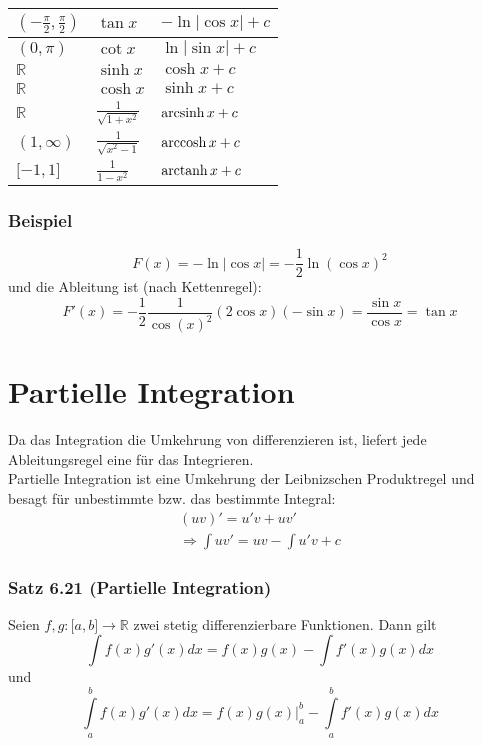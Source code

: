 \begin{tabularx}{\textwidth}{|Y|Y|Y|}
$(-\frac{\pi}{2},\frac{\pi}{2})$        & $\tan{x}$                             & $- \ln \left| {\cos x} \right| + c$                                                                \\ [1.5ex]\hline
$(0,\pi)$        & $\cot{x}$                             & $\ln \left| {\sin x} \right| + c$                                                                \\[1.5ex]\hline
$\mathbb{R}$ & $\sinh x$ & $\cosh x + c$\\[1.5ex]\hline
$\mathbb{R}$ & $\cosh x$ & $\sinh x + c$\\[1.5ex]\hline
$\mathbb{R}$ & $\frac{1}{\sqrt{1+x^2}}$  & $\operatorname{arcsinh} x + c$ \\[1.5ex]\hline
$(1,\infty)$ & $\frac{1}{\sqrt{x^2-1}}$ & $\operatorname{arccosh} x + c$ \\[1.5ex]\hline
$\lbrack -1,1\rbrack$ & $\frac{1}{1-x^2}$ & $\operatorname{arctanh} x + c$ \\[1.5ex]\hline
 \end{tabularx}

\subsubsection*{Beispiel}
$$F(x)=-\ln\left| \cos x \right| = -\frac{1}{2}\ln\left(\cos x\right)^2$$
und die Ableitung ist (nach Kettenregel):
\[F'(x) =  - \frac{1}{2}\frac{1}{{\cos {{(x)}^2}}}(2\cos x)( - \sin x) = \frac{{\sin x}}{{\cos x}} = \tan x\]

\section{Partielle Integration}
Da das Integration die Umkehrung von differenzieren ist, liefert jede Ableitungsregel eine für das Integrieren.\\

Partielle Integration ist eine Umkehrung der Leibnizschen Produktregel und besagt für unbestimmte bzw. das bestimmte Integral:
\[\begin{array}{c}
(uv)' = u'v + uv'\\
 \Rightarrow \int {uv'}  = uv - \int {u'v}  + c
\end{array}\]

\subsubsection*{Satz 6.21 (Partielle Integration)}
Seien $f,g:\lbrack a,b\rbrack\rightarrow\mathbb{R}$ zwei stetig differenzierbare Funktionen. Dann gilt 
\[\int {f(x)g'(x)dx = f(x)g(x) - \int {f'(x)g(x)dx} } \]
und
\[\int\limits_a^b {f(x)g'(x)dx = \left. {f(x)g(x)} \right|_a^b - \int\limits_a^b {f'(x)g(x)dx} } \]
